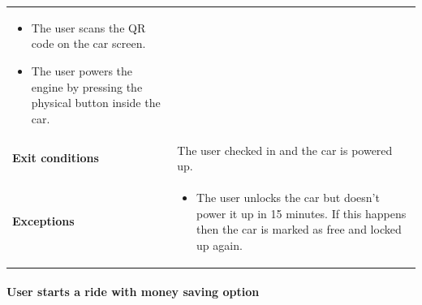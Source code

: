 \documentclass[]{article}
\providecommand{\tightlist}{%
  \setlength{\itemsep}{0pt}\setlength{\parskip}{0pt}}
\let\oldparagraph\paragraph
\renewcommand{\paragraph}[1]{\oldparagraph{#1}\mbox{}}
\begin{document}
\begin{longtable}[]{@{}ll@{}}
\begin{minipage}[t]{0.65\columnwidth}
\begin{itemize}
\item
  The user scans the QR code on the car screen.
\item
  The user powers the engine by pressing the physical button inside the
  car.
\end{itemize}\strut
\end{minipage}\tabularnewline
\begin{minipage}[t]{0.29\columnwidth}\raggedright\strut
\textbf{Exit conditions}\strut
\end{minipage} & \begin{minipage}[t]{0.65\columnwidth}\raggedright\strut
The user checked in and the car is powered up.\strut
\end{minipage}\tabularnewline
\begin{minipage}[t]{0.29\columnwidth}\raggedright\strut
\textbf{Exceptions}\strut
\end{minipage} & \begin{minipage}[t]{0.65\columnwidth}\raggedright\strut
\begin{itemize}
\tightlist
\item
  The user unlocks the car but doesn't power it up in 15 minutes. If
  this happens then the car is marked as free and locked up again.
\end{itemize}\strut
\end{minipage}\tabularnewline
\bottomrule
\end{longtable}

\newpage

\paragraph{User starts a ride with money saving
option}\label{user-starts-a-ride-with-money-saving-option}
\end{document}
